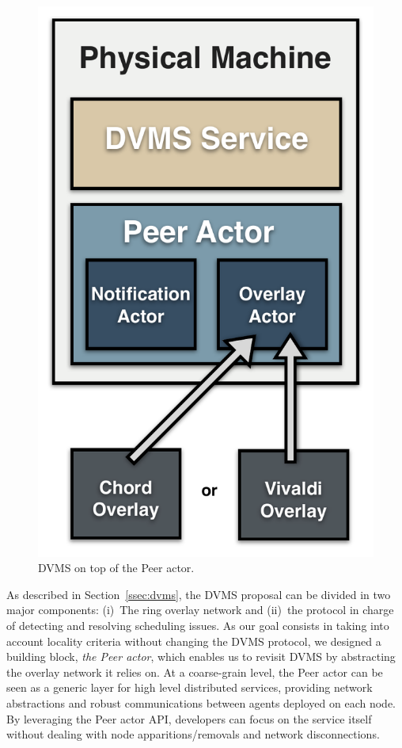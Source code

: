 \begin{figure}
\vspace{-.7cm}\hspace*{.2cm}
  \includegraphics[width=\linewidth]{Figures/DVMS.pdf}
  \caption{DVMS on top of the Peer actor.}%
  \label{fig:peeractor}%
\end{figure}

As described in Section~\ref{ssec:dvms}, the DVMS proposal can be divided in two major
components: (i)~The ring overlay network and (ii)~the protocol in charge
of detecting and resolving scheduling issues. As our goal consists in taking into account
locality criteria without changing the DVMS protocol, we designed a building block, \ie
\emph{the Peer actor}, which enables us to revisit DVMS by abstracting the overlay network it
relies on. At a coarse-grain level, the Peer actor can be seen as a generic layer for high
level distributed services, providing network abstractions and robust communications
between agents deployed on each node. By leveraging the Peer actor API, developers can
focus on the service itself without dealing with node apparitions/removals and network
disconnections.

